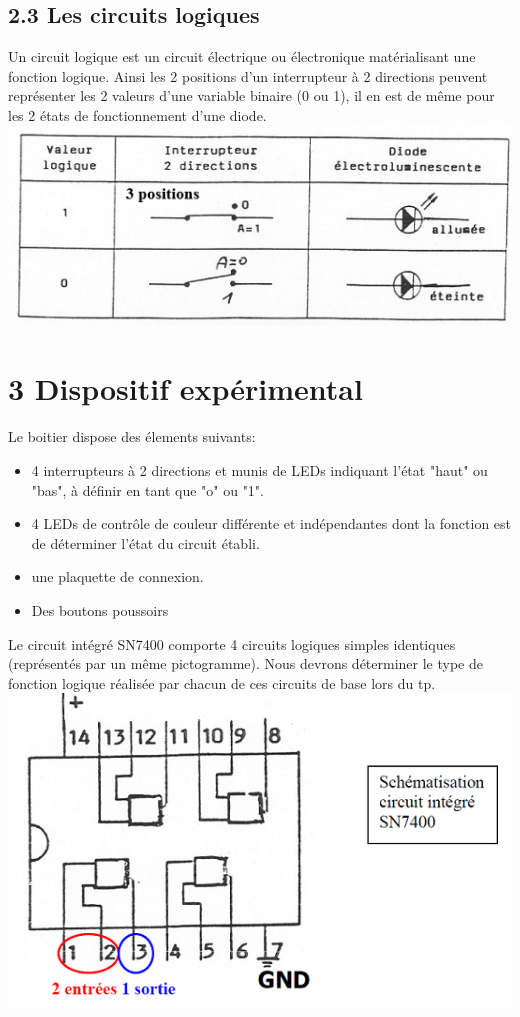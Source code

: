 \documentclass{report}
\begin{document}
\subsection*{2.3 Les circuits logiques}

Un circuit logique est un circuit électrique ou électronique matérialisant une fonction logique. Ainsi les 2 positions d'un interrupteur à 2 directions peuvent représenter les 2 valeurs d'une variable binaire (0 ou 1), il en est de même pour les 2 états de fonctionnement d'une diode.\\
\includegraphics{CirLo.png} \\



\section*{3 Dispositif exp\'erimental}
Le boitier dispose des \'elements suivants:
\begin{itemize}
\item 4 interrupteurs à 2 directions et munis de LEDs indiquant l'état "haut" ou "bas", à définir en tant que "o" ou "1".
\item 4 LEDs de contr\^ole de couleur différente et indépendantes dont la fonction est de déterminer l'état du circuit établi.
\item une plaquette de connexion.
\item Des boutons poussoirs
\end{itemize}

Le circuit int\'egr\'e SN7400 comporte 4 circuits logiques simples identiques (représentés par un même pictogramme). Nous devrons déterminer le type de fonction logique réalisée par chacun de ces circuits de base lors du tp.\\
\includegraphics[scale=1]{CirInt.png} 
\end{document}
